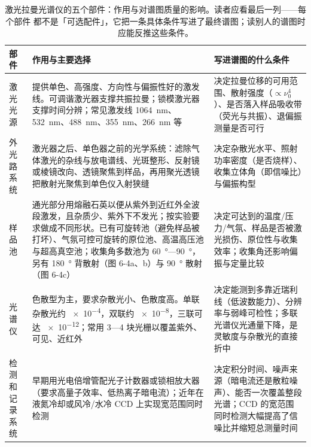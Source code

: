 \begin{table}[htbp]
\centering
\caption{激光拉曼光谱仪的五个部件：作用与对谱图质量的影响。读者应看最后一列——每个部件
都不是「可选配件」，它把一条具体条件写进了最终谱图；读别人的谱图时应能反推这些条件。
}
\label{tab:raman-parts}
{\srcsize
\begin{tabularx}{\columnwidth}{@{}lXX@{}}
\toprule
部件 & 作用与主要选择 & 写进谱图的什么条件 \\
\midrule
激光光源 & 提供单色、高强度、方向性与偏振性好的激发线。可调谐激光器支撑共振拉曼；锁模激光器支撑时间分辨；常见激发线 \qty{1064}{nm}、\qty{532}{nm}、\qty{488}{nm}、\qty{355}{nm}、\qty{266}{nm} 等 & 决定拉曼位移的可用范围、散射强度（$\propto\nu_0^4$）、是否落入样品吸收带（荧光与共振）、退偏振测量是否可行 \\
外光路系统 & 激光器之后、单色器之前的光学系统：滤除气体激光的杂线与放电谱线、光斑整形、反射镜或棱镜改向、透镜聚焦到样品，再用聚光透镜把散射光聚焦到单色仪入射狭缝 & 决定杂散光水平、照射功率密度（是否烧样）、收集立体角（即信噪比）与偏振构型 \\
样品池 & 通光部分用熔融石英以便从紫外到近红外全波段激发，且杂质少、紫外下不发光；按实验要求做成不同形状。已有可旋转池（避免样品被打坏）、气氛可控可旋转的原位池、高温高压池与超高真空池；收集角多数池为 \qty{60}{\degree}—\qty{90}{\degree}，另有 \qty{180}{\degree} 背散射（图 6-4a、b）与 \qty{90}{\degree} 散射（图 6-4c） & 决定可达到的温度/压力/气氛、样品是否被激光损伤、原位性与收集效率；收集角还影响偏振与定量比较 \\
光谱仪 & 色散型为主，要求杂散光小、色散度高。单联杂散光约 \num{e-4}，双联约 \num{e-8}，三联可达 \num{e-12}；常用 3—4 块光栅以覆盖紫外、可见、近红外 & 决定能测到多靠近瑞利线（低波数能力）、分辨率与弱峰可检性；多联光谱仪光通量下降，是灵敏度与杂散光的直接折中 \\
检测和记录系统 & 早期用光电倍增管配光子计数器或锁相放大器（要求高量子效率、低热离子暗电流）；近年在液氮冷却或风冷/水冷 CCD 上实现宽范围同时检测 & 决定积分时间、噪声来源（暗电流还是散粒噪声）、能否一次覆盖整段光谱；CCD 的宽范围同时检测大幅提高了信噪比并缩短总测量时间 \\
\bottomrule
\end{tabularx}}
\end{table}


